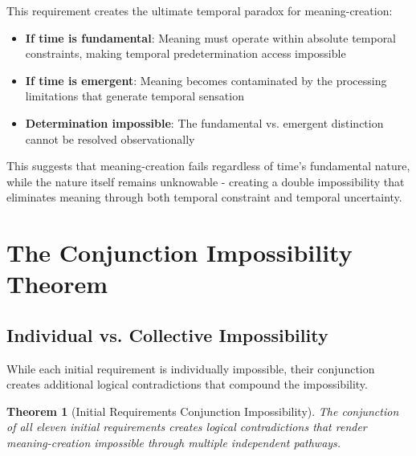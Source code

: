 \documentclass[12pt,a4paper]{article}
\newtheorem{theorem}{Theorem}[section]
\begin{document}
This requirement creates the ultimate temporal paradox for meaning-creation:

\begin{itemize}
\item \textbf{If time is fundamental}: Meaning must operate within absolute temporal constraints, making temporal predetermination access impossible
\item \textbf{If time is emergent}: Meaning becomes contaminated by the processing limitations that generate temporal sensation
\item \textbf{Determination impossible}: The fundamental vs. emergent distinction cannot be resolved observationally
\end{itemize}

This suggests that meaning-creation fails regardless of time's fundamental nature, while the nature itself remains unknowable - creating a double impossibility that eliminates meaning through both temporal constraint and temporal uncertainty.

\section{The Conjunction Impossibility Theorem}

\subsection{Individual vs. Collective Impossibility}

While each initial requirement is individually impossible, their conjunction creates additional logical contradictions that compound the impossibility.

\begin{theorem}[Initial Requirements Conjunction Impossibility]
The conjunction of all eleven initial requirements creates logical contradictions that render meaning-creation impossible through multiple independent pathways.
\end{theorem}
\end{document}
